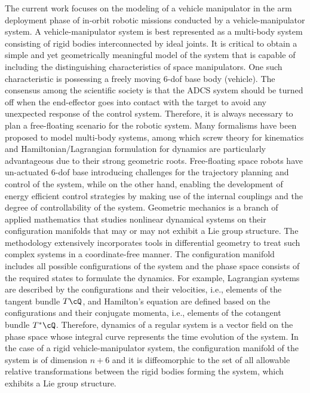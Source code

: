 \documentclass[lettersize,journal]{IEEEtran}
\begin{document}
The current work focuses on the modeling of a vehicle manipulator in the arm deployment phase of in-orbit robotic missions conducted by a vehicle-manipulator system.
A vehicle-manipulator system is best represented as a multi-body system consisting of rigid bodies interconnected by ideal joints. It is critical to obtain a simple and yet geometrically meaningful model of the system that is capable of including the distinguishing characteristics of space manipulators. One such characteristic is possessing a freely moving 6-dof base body (vehicle). The consensus among the scientific society is that the ADCS system should be turned off when the end-effector goes into contact with the target to avoid any unexpected response of the control system. Therefore, it is always necessary to plan a free-floating scenario for the robotic system. Many formalisms have been proposed to model multi-body systems, among which screw theory for kinematics\cite{murray2017mathematical} and Hamiltonian/Lagrangian formulation for dynamics\cite{stramigioli2000hamiltonian,Chhabra2014a}{} are particularly advantageous due to their strong geometric roots. Free-floating space robots have un-actuated 6-dof base\cite{Tortopidis}{} introducing challenges for the trajectory planning and control of the system, while on the other hand, enabling the development of energy efficient control strategies\cite{Transactions2013}{} by making use of the internal couplings and the degree of controllability of the system\cite{huang2017path}{}. 
Geometric mechanics is a branch of applied mathematics that studies nonlinear dynamical systems on their configuration manifolds that may or may not exhibit a Lie group structure. The methodology extensively incorporates tools in differential geometry to treat such complex systems in a coordinate-free manner. The configuration manifold includes all possible configurations of the system and the phase space consists of the required states to formulate the dynamics. For example, Lagrangian systems are described by the configurations and their velocities, i.e., elements of the tangent bundle $T\cQ$, and Hamilton's equation are defined based on the configurations and their conjugate momenta, i.e., elements of the cotangent bundle $T^*\cQ$. Therefore, dynamics of a regular system is a vector field on the phase space whose integral curve represents the time evolution of the system\cite{muller2016geometric}. In the case of a rigid vehicle-manipulator system, the configuration manifold of the system is of dimension $n+6$ and it is diffeomorphic to the set of all allowable relative transformations between the rigid bodies forming the system, which exhibits a Lie group structure. 
\end{document}
